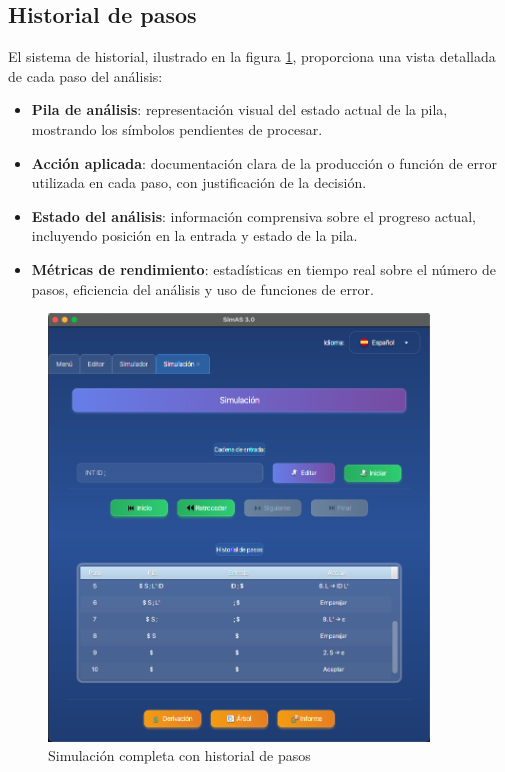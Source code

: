 \subsection{Historial de pasos}

El sistema de historial, ilustrado en la figura \ref{fig:simulacion_completa}, proporciona una vista detallada de cada paso del análisis:

\begin{itemize}
    \item \textbf{Pila de análisis}: representación visual del estado actual de la pila, mostrando los símbolos pendientes de procesar.
    \item \textbf{Acción aplicada}: documentación clara de la producción o función de error utilizada en cada paso, con justificación de la decisión.
    \item \textbf{Estado del análisis}: información comprensiva sobre el progreso actual, incluyendo posición en la entrada y estado de la pila.
    \item \textbf{Métricas de rendimiento}: estadísticas en tiempo real sobre el número de pasos, eficiencia del análisis y uso de funciones de error.
\end{itemize}

\needspace{8cm}
\begin{figure}[H]
    \centering
    \includegraphics[width=0.9\textwidth]{figuras/simulador/simulacion_completa.png}
    \caption{Simulación completa con historial de pasos}
    \label{fig:simulacion_completa}
\end{figure}

